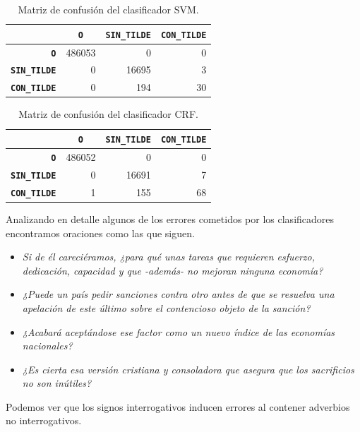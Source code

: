 \documentclass[runningheads,a4paper]{llncs}
\begin{document}
\begin{table}[ht]
 	\renewcommand{\arraystretch}{1.3}
	\renewcommand{\tabcolsep}{3pt}
	\caption{Matriz de confusión del clasificador SVM.}
	\label{table:confusion-svm}
	\centering
	\begin{tabular}{|r||r|r|r|}
		\hline
			& \multicolumn{1}{c|}{\textbf{\texttt{~O~}}}
			& \multicolumn{1}{c|}{\textbf{\texttt{SIN\_TILDE}}}
			& \multicolumn{1}{c|}{\textbf{\texttt{CON\_TILDE}}} \\
		\hline\hline
		\textbf{\texttt{O}}			 & 486053 & 0 & 0 \\ \hline
		\textbf{\texttt{SIN\_TILDE}} & 0 & 16695 & 3 \\ \hline
		\textbf{\texttt{CON\_TILDE}} & 0 & 194 & 30 \\ 
		\hline
	\end{tabular}
\end{table}

\begin{table}[ht]
 	\renewcommand{\arraystretch}{1.3}
	\renewcommand{\tabcolsep}{3pt}
	\caption{Matriz de confusión del clasificador CRF.}
	\label{table:confusion-crf}
	\centering
	\begin{tabular}{|r||r|r|r|}
		\hline
			& \multicolumn{1}{c|}{\textbf{\texttt{~O~}}}
			& \multicolumn{1}{c|}{\textbf{\texttt{SIN\_TILDE}}}
			& \multicolumn{1}{c|}{\textbf{\texttt{CON\_TILDE}}} \\
		\hline\hline
		\textbf{\texttt{O}}			 & 486052 & 0 & 0 \\ \hline
		\textbf{\texttt{SIN\_TILDE}} & 0 & 16691 & 7 \\ \hline
		\textbf{\texttt{CON\_TILDE}} & 1 & 155 & 68 \\ 
		\hline
	\end{tabular}
\end{table}

Analizando en detalle algunos de los errores cometidos por los clasificadores encontramos oraciones como las que siguen.
\begin{itemize}
\item{\emph{Si de él careciéramos, ¿para qué unas tareas que requieren esfuerzo, dedicación, capacidad y que -además- no mejoran ninguna economía?}}
\item{\emph{¿Puede un país pedir sanciones contra otro antes de que se resuelva una apelación de este último sobre el contencioso objeto de la sanción?}}
\item{\emph{¿Acabará aceptándose ese factor como un nuevo índice de las economías nacionales?}}
\item{\emph{¿Es cierta esa versión cristiana y consoladora que asegura que los sacrificios no son inútiles?}}
\end{itemize}
Podemos ver que los signos interrogativos inducen errores al contener adverbios no interrogativos.
\end{document}
